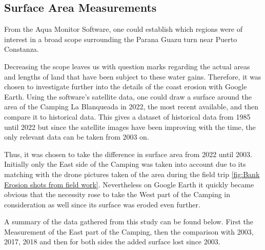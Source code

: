 \subsection{Surface Area Measurements}
From the Aqua Monitor Software, one could establish which regions were of interest in a broad scope surrounding the Parana Guazu turn near Puerto Constanza. 

Decreasing the scope leaves us with question marks regarding the actual areas and lengths of land that have been subject to these water gains. Therefore, it was chosen to investigate further into the details of the coast erosion with Google Earth.
Using the software's satellite data, one could draw a surface around the area of the Camping La Blanqueada in 2022, the most recent available, and then compare it to historical data. 
This gives a dataset of historical data from 1985 until 2022 but since the satellite images have been improving with the time, the only relevant data can be taken from 2003 on.


Thus, it was chosen to take the difference in surface area from 2022 until 2003. Initially only the East side of the Camping was taken into account due to its matching with the drone pictures taken of the area during the field trip \ref{fig:Bank Erosion shots from field work}. Nevertheless on Google Earth it quickly became obvious that the necessity rose to take the West part of the Camping in consideration as well since its surface was eroded even further.

A summary of the data gathered from this study can be found below. First the Measurement of the East part of the Camping, then the comparison with 2003, 2017, 2018 and then for both sides the added surface lost since 2003.

